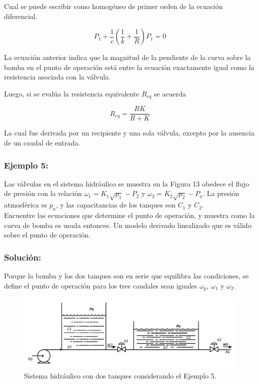 \documentclass[a4paper,12pt,twoside]{proyectotanquesecci}
\begin{document}
Cual se puede escribir como homogéneo de primer orden de la ecuación diferencial.

\begin{equation}
P_{1}+\frac {1}{c}\left( \frac {1}{k}+\frac {1}{R}\right) P_{1}=0
\end{equation}

La ecuación anterior indica que la magnitud de la pendiente de la curva sobre la bomba en el punto de operación  está entre la ecuación exactamente igual como la resistencia asociada con la válvula. 

Luego, si se evalúa la resistencia equivalente $R_{eq}$ se acuerda

\begin{equation}
R_{eq}=\frac {RK}{R+K}
\end{equation}

La cual fue derivada por un recipiente y una sola válvula, excepto por la ausencia de un caudal de entrada. \\

\subsubsection{Ejemplo 5:}

Las válvulas en el sistema hidráulico se muestra en la Figura 13 obedece el flujo de presión con la relación $\omega _{1}=K_{1}\sqrt {p_{1}}-P_{2}$ y $\omega _{2}=K_{2}\sqrt {p_{2}}-P_{a}$. La presión atmosférica es $p_{a}$, y las capacitancias de los tanques son $C_{1}$ y $C_{2}$. \\
Encuentre las ecuaciones que determine el punto de operación, y muestra como la curva de bomba es usada entonces. Un modelo derivado linealizado que es válido sobre el punto de operación. \\

\subsubsection{Solución:}

Porque la bomba y los dos tanques son en serie que equilibra las condiciones, se define el punto de operación para los tres caudales sean iguales $\omega_{p}$, $\omega_{1}$ y $\omega_{2}$.

\begin{figure}[h]
\centering
\includegraphics[scale=0.6]{Figura12}
\renewcommand{\figurename}{Fig.}
\caption{Sistema hidráulico con dos tanques considerando el Ejemplo 5.}
\label{Sistema hidráulico con dos tanques considerando el Ejemplo 5.}
\end{figure}
\end{document}
